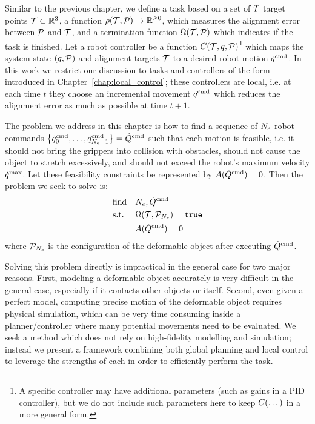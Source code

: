 Similar to the previous chapter, we define a task based on a set of $T$ target points $\mathcal{T} \subset \mathbb{R}^3$, a function $\rho(\mathcal{T}, \mathcal{P}) \rightarrow \mathbb{R}^{\geq 0}$, which measures the alignment error between $\mathcal{P}$ and $\mathcal{T}$, and a termination function $\Omega(\mathcal{T}, \mathcal{P})$ which indicates if the task is finished. Let a robot controller be a function $C(\mathcal{T}, q, \mathcal{P})$\footnote{A specific controller may have additional parameters (such as gains in a PID controller), but we do not include such parameters here to keep $C(\dots)$ in a more general form.} which maps the system state $\left( q, \mathcal{P} \right)$ and alignment targets $\mathcal{T}$ to a desired robot motion $\dot{q}^{\textrm{cmd}}$. In this work we restrict our discussion to tasks and controllers of the form introduced in Chapter~\ref{chap:local_control}; these controllers are local, i.e. at each time $t$ they choose an incremental movement $\dot{q}^{\textrm{cmd}}$ which reduces the alignment error as much as possible at time $t + 1$. 

The problem we address in this chapter is how to find a sequence of $N_e$ robot commands $\left\{ \dot{q}^{\textrm{cmd}}_0, \dots, \dot{q}^{\textrm{cmd}}_{N_e-1} \right\} = \dot Q^{\textrm{cmd}}$ such that each motion is feasible, i.e. it should not bring the grippers into collision with obstacles, should not cause the object to stretch excessively, and should not exceed the robot's maximum velocity $\dot{q}^\textrm{max}$. Let these feasibility constraints be represented by $A(\dot Q^{\textrm{cmd}}) = 0$. Then the problem we seek to solve is:
\begin{equation}
    \begin{aligned}
        & \text{find}   & & N_e, \dot Q^{\textrm{cmd}} \\
        & \text{s.t.}   & & \Omega(\mathcal{T}, \mathcal{P}_{N_e}) = \texttt{true}\\ 
        &               & & A(\dot Q^{\textrm{cmd}}) = 0\\
    \end{aligned}
    \label{eqn:veb_general_problem}
\end{equation}
where $\mathcal{P}_{N_e}$ is the configuration of the deformable object after executing $\dot Q^{\textrm{cmd}}$.

Solving this problem directly is impractical in the general case for two major reasons. First, modeling a deformable object accurately is very difficult in the general case, especially if it contacts other objects or itself. Second, even given a perfect model, computing precise motion of the deformable object requires physical simulation, which can be very time consuming inside a planner/controller where many potential movements need to be evaluated. We seek a method which does not rely on high-fidelity modelling and simulation; instead we present a framework combining both global planning and local control to leverage the strengths of each in order to efficiently perform the task.

